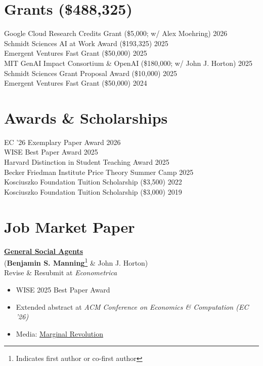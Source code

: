\documentclass[margin,line,pifont,palatino,courier, 9pt]{res}
\begin{document}
\begin{resume}
\section{\sc Grants (\$488,325)}
Google Cloud Research Credits Grant (\$5,000; w/ Alex Moehring) \hfill 2026 \\
Schmidt Sciences AI at Work Award (\$193,325) \hfill 2025 \\
Emergent Ventures Fast Grant (\$50,000) \hfill 2025 \\
MIT GenAI Impact Consortium \& OpenAI (\$180,000; w/ John J. Horton) \hfill 2025 \\
Schmidt Sciences Grant Proposal Award (\$10,000) \hfill 2025 \\
Emergent Ventures Fast Grant (\$50,000) \hfill 2024

\section{\sc Awards \& Scholarships}
EC '26 Exemplary Paper Award \hfill 2026 \\
WISE Best Paper Award \hfill 2025 \\
Harvard Distinction in Student Teaching Award \hfill 2025 \\
Becker Friedman Institute Price Theory Summer Camp \hfill 2025 \\
Kosciuszko Foundation Tuition Scholarship (\$3,500) \hfill 2022 \\
Kosciuszko Foundation Tuition Scholarship (\$3,000) \hfill 2019


\section{\sc Job Market Paper}

\href{https://benjaminmanning.io/files/general_social_agents.pdf}{\bf General Social Agents}\\
(\textbf{Benjamin S. Manning}\footnote{Indicates first author or co-first author} \& John J. Horton)\\
Revise \& Resubmit at \textit{Econometrica}
\vspace{0.25cm}
\begin{itemize}
\item WISE 2025 Best Paper Award
\item Extended abstract at \textit{ACM Conference on Economics \& Computation (EC '26)}
\item Media: \href{https://marginalrevolution.com/marginalrevolution/2025/09/pathbreaking-paper-on-ai-simulations-of-human-behavior.html}{Marginal Revolution}
\end{itemize}


\end{resume}
\end{document}

